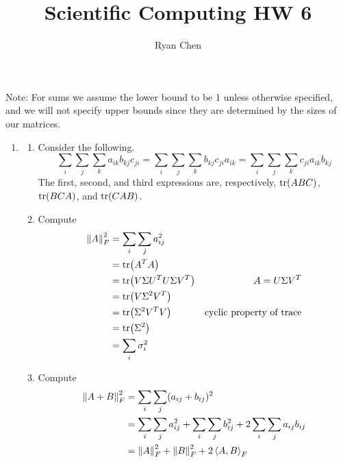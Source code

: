 \documentclass{article}
\title{Scientific Computing HW 6}
\author{Ryan Chen}
\newcommand{\lbr}[1]{\left\langle#1\right\rangle}
\renewcommand{\S}{\Sigma}
\newcommand{\s}{\sigma}
\renewcommand{\ip}[2]{\lbr{#1,#2}}
\begin{document}
	
\maketitle



Note: For sums we assume the lower bound to be 1 unless otherwise specified, and we will not specify upper bounds since they are determined by the sizes of our matrices.

\begin{enumerate}
	
	
	
	\item 
	
	\begin{enumerate}
		
		
		
		\item Consider the following.
		\[\sum_i\sum_j\sum_k a_{ik}b_{kj}c_{ji} = \sum_i\sum_j\sum_k b_{kj}c_{ji}a_{ik} = \sum_i\sum_j\sum_k c_{ji}a_{ik}b_{kj}\]
		The first, second, and third expressions are, respectively, $\tr(ABC)$, $\tr(BCA)$, and $\tr(CAB)$.
		
		
		
		\item Compute
		\begin{align*}
			\norm{A}_F^2 &= \sum_i\sum_j a_{ij}^2 \\
			&= \tr(A^TA) \\
			&= \tr(V\S U^TU\S V^T) & A = U\S V^T \\
			&= \tr(V\S^2V^T) \\
			&= \tr(\S^2V^TV) & \text{cyclic property of trace} \\
			&= \tr(\S^2) \\
			&= \sum_i \s_i^2
		\end{align*}
		
		
		
		\item Compute
		\begin{align*}
			\norm{A+B}_F^2 &= \sum_i\sum_j (a_{ij}+b_{ij})^2 \\
			&= \sum_i\sum_j a_{ij}^2 + \sum_i\sum_j b_{ij}^2 + 2\sum_i\sum_j a_{ij}b_{ij} \\
			&= \norm{A}_F^2 + \norm{B}_F^2 + 2\ip{A}{B}_F
		\end{align*}
		
		
		
	\end{enumerate}




\end{enumerate}
\end{document}
